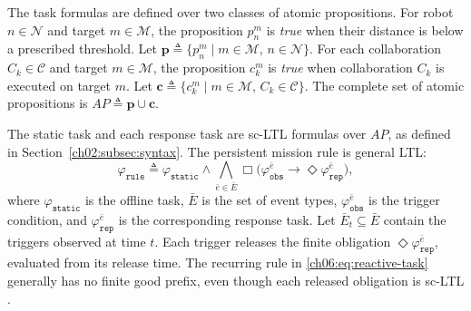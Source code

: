 The task formulas are defined over two classes of atomic propositions. For
robot $n \in \mathcal{N}$ and target $m \in \mathcal{M}$, the proposition
$p_n^m$ is \textit{true} when their distance is below a prescribed threshold.
Let
$\textbf{p} \triangleq
\{p_n^m \mid m \in \mathcal{M},\, n \in \mathcal{N}\}$. For each
collaboration $C_k \in \mathcal{C}$ and target $m \in \mathcal{M}$, the
proposition $c_k^m$ is \textit{true} when collaboration $C_k$ is
executed on target $m$. Let
$\textbf{c} \triangleq
\{c_k^m \mid m \in \mathcal{M},\, C_k \in \mathcal{C}\}$. The complete
set of atomic propositions is
$AP \triangleq \textbf{p} \cup \textbf{c}$.
\begin{revision}
The static task and each response task are sc-LTL formulas over $AP$, as
defined in Section~\ref{ch02:subsec:syntax}. The persistent mission rule is
general LTL:
\begin{equation}
\label{ch06:eq:reactive-task}
\varphi_{\texttt{rule}} \triangleq \varphi_{\texttt{static}}
\wedge
\bigwedge_{\bar{e} \in \bar{E}}
\Box\bigl(
\varphi_{\texttt{obs}}^{\bar{e}}
\rightarrow
\Diamond \varphi_{\texttt{rep}}^{\bar{e}}
\bigr),
\end{equation}
where $\varphi_{\texttt{static}}$ is the offline task, $\bar E$ is the set
of event types, $\varphi_{\texttt{obs}}^{\bar e}$ is the trigger condition,
and $\varphi_{\texttt{rep}}^{\bar e}$ is the corresponding response task.
Let $\bar E_t\subseteq\bar E$ contain the triggers observed at time $t$.
Each trigger releases the finite obligation
$\Diamond\varphi_{\texttt{rep}}^{\bar e}$, evaluated from its release time.
The recurring rule in \eqref{ch06:eq:reactive-task} generally has no finite
good prefix, even though each released obligation is sc-LTL
\citep{baier2008principles,belta2017formal}.
\end{revision}

